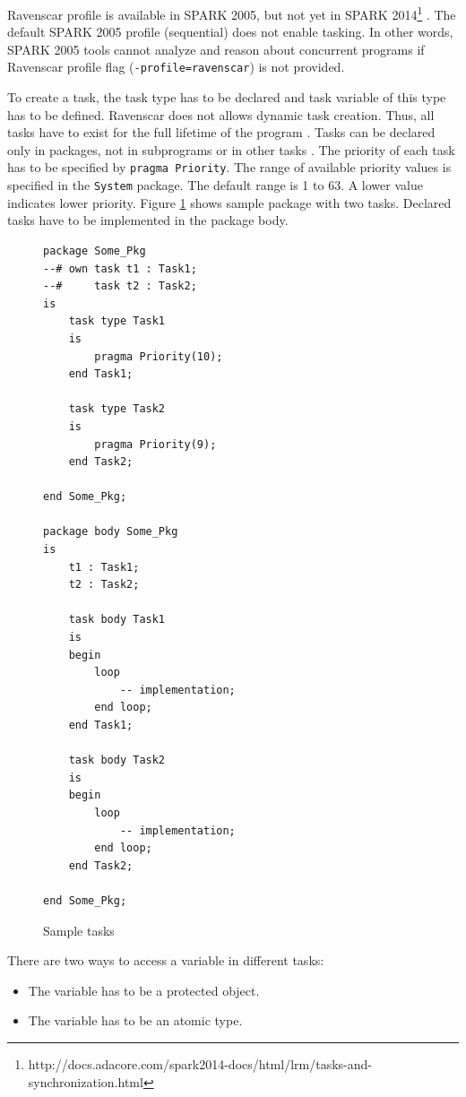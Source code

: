 Ravenscar profile is available in SPARK 2005, but not yet in SPARK 2014\footnote{http://docs.adacore.com/spark2014-docs/html/lrm/tasks-and-synchronization.html} \cite{Spark2014refManual:Online}. The default SPARK 2005 profile (sequential) does not enable tasking. In other words, SPARK 2005 tools cannot analyze and reason about concurrent programs if Ravenscar profile flag (\lstinline{-profile=ravenscar}) is not provided.

To create a task, the task type has to be declared and task variable of this type has to be defined. Ravenscar does not allows dynamic task creation. Thus, all tasks have to exist for the full lifetime of the program \cite{IssuesWithRavenscar:Paper}. Tasks can be declared only in packages, not in subprograms or in other tasks \cite{Barnes:Book}. The priority of each task has to be specified by \lstinline{pragma Priority}. The range of available priority values is specified in the \lstinline{System} package. The default range is 1 to 63. A lower value indicates lower priority. Figure \ref{listing:SampleTask} shows sample package with two tasks. Declared tasks have to be implemented in the package body.

\begin{figure}[ht]
\singlespacing
\begin{lstlisting}[frame=single, gobble=0]
package Some_Pkg
--# own task t1 : Task1;
--#     task t2 : Task2;
is
	task type Task1
	is
		pragma Priority(10);
	end Task1;

	task type Task2
	is
		pragma Priority(9);
	end Task2;

end Some_Pkg;

package body Some_Pkg
is
	t1 : Task1;
	t2 : Task2;

	task body Task1
	is
	begin
		loop
			-- implementation;
		end loop;
	end Task1;

	task body Task2
	is
	begin
		loop
			-- implementation;
		end loop;
	end Task2;

end Some_Pkg;
\end{lstlisting} 
\doublespacing
\caption{Sample tasks}
\label{listing:SampleTask}
\end{figure}

There are two ways to access a variable in different tasks:
\begin{itemize}
    \item The variable has to be a protected object.
    \item The variable has to be an atomic type.
\end{itemize}

